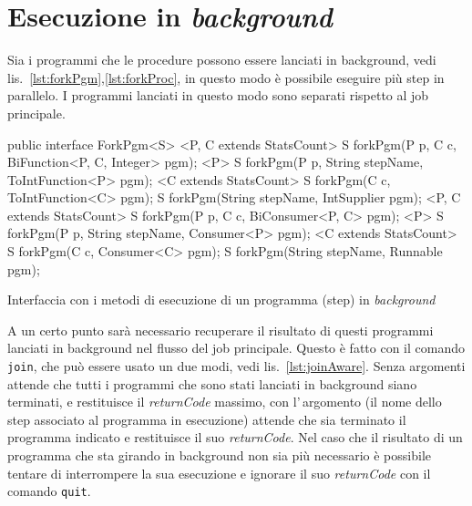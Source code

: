 \section{Esecuzione in \textit{background}} \label{sec:fork}
Sia i programmi che le procedure possono essere lanciati in background,
vedi lis.~\ref{lst:forkPgm},\ref{lst:forkProc}, in questo modo è possibile
eseguire più step in parallelo.
I programmi lanciati in questo modo sono separati rispetto al job principale.

\begin{elisting}[!htb]
\begin{javacode}
public interface ForkPgm<S> {
    <P, C extends StatsCount> S forkPgm(P p, C c, BiFunction<P, C, Integer> pgm);
    <P> S forkPgm(P p, String stepName, ToIntFunction<P> pgm);
    <C extends StatsCount> S forkPgm(C c, ToIntFunction<C> pgm);
    S forkPgm(String stepName, IntSupplier pgm);
    <P, C extends StatsCount> S forkPgm(P p, C c, BiConsumer<P, C> pgm);
    <P> S forkPgm(P p, String stepName, Consumer<P> pgm);
    <C extends StatsCount> S forkPgm(C c, Consumer<C> pgm);
    S forkPgm(String stepName, Runnable pgm);
}
\end{javacode}
\caption{Interfaccia con i metodi di esecuzione di un programma (step) in \textit{background}}
\label{lst:forkPgm}
\end{elisting}

A un certo punto sarà necessario recuperare il risultato di questi programmi
lanciati in background nel flusso del job principale.
Questo è fatto con il comando \texttt{join}, che può essere usato un due modi,
vedi lis.~\ref{lst:joinAware}.
Senza argomenti attende che tutti i programmi che sono stati lanciati in
background siano terminati, e restituisce il \textsl{returnCode} massimo,
con l'\,argomento (il nome dello step associato al programma in esecuzione)
attende che sia terminato il programma indicato e restituisce il suo
\textsl{returnCode}.
Nel caso che il risultato di un programma che sta girando in background non
sia più necessario è possibile tentare di interrompere la sua esecuzione e
ignorare il suo \textsl{returnCode} con il comando \texttt{quit}.

